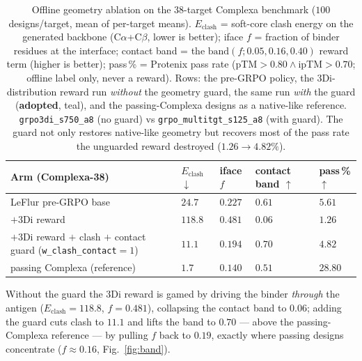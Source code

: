 \documentclass[11pt]{article}
\newcommand{\eclash}{E_{\mathrm{clash}}}
\newcommand{\ttk}[1]{\texttt{\small #1}}
\begin{document}
\begin{table}[htbp]
\centering
{\renewcommand{\arraystretch}{1.2}%
\begin{tabular}{@{}>{\raggedright\arraybackslash}p{5.7cm}
                    >{\centering\arraybackslash}p{2.0cm}
                    >{\centering\arraybackslash}p{1.8cm}
                    >{\centering\arraybackslash}p{2.2cm}
                    >{\centering\arraybackslash}p{1.7cm}@{}}
\toprule
\textbf{Arm (Complexa-38)} & \textbf{$\eclash$ $\downarrow$} & \textbf{iface $f$} & \textbf{contact band $\uparrow$} & \textbf{pass\,\% $\uparrow$}\\
\midrule
LeFlur pre-GRPO base                                        & $24.7$  & $0.227$ & $0.61$ & $5.61$\\
$+$3Di reward                       & $118.8$ & $0.481$ & $0.06$ & $1.26$\\
\rowcolor{aTint}$+$3Di reward $+$ clash $+$ contact guard (\ttk{w\_clash\_contact}$=1$) & $\mathbf{11.1}$ & $\mathbf{0.194}$ & $\mathbf{0.70}$ & $\mathbf{4.82}$\\
passing Complexa (reference)                                & $1.7$   & $0.140$ & $0.51$ & $28.80$\\
\bottomrule
\end{tabular}}
\caption{Offline geometry ablation on the $38$-target Complexa benchmark ($100$ designs/target,
mean of per-target means). $\eclash$ = soft-core clash energy on the generated backbone
(C$\alpha$+C$\beta$, lower is better); iface $f$ = fraction of binder residues at the interface;
contact band = the $\mathrm{band}(f;0.05,0.16,0.40)$ reward term (higher is better); pass\,\% =
Protenix pass rate (pTM$>\!0.80\wedge$ipTM$>\!0.70$; offline label only, never a reward). Rows: the
pre-GRPO policy, the 3Di-distribution reward run \emph{without} the geometry guard, the same run
\emph{with} the guard (\textbf{adopted}, teal), and the passing-Complexa designs as a native-like
reference. \ttk{grpo3di\_s750\_a8} (no guard) vs \ttk{grpo\_multitgt\_s125\_a8} (with guard). The
guard not only restores native-like geometry but recovers most of the pass rate the unguarded
reward destroyed ($1.26\!\to\!4.82\%$).}
\label{tab:geomablation}
\end{table}
Without the guard the 3Di reward is gamed by driving the binder \emph{through} the antigen
($\eclash\!=\!118.8$, $f\!=\!0.481$), collapsing the contact band to $0.06$; adding the guard
cuts clash to $11.1$ and lifts the band to $0.70$ --- above the passing-Complexa reference ---
by pulling $f$ back to $0.19$, exactly where passing designs concentrate ($f\!\approx\!0.16$,
Fig.~\ref{fig:band}).
\end{document}
